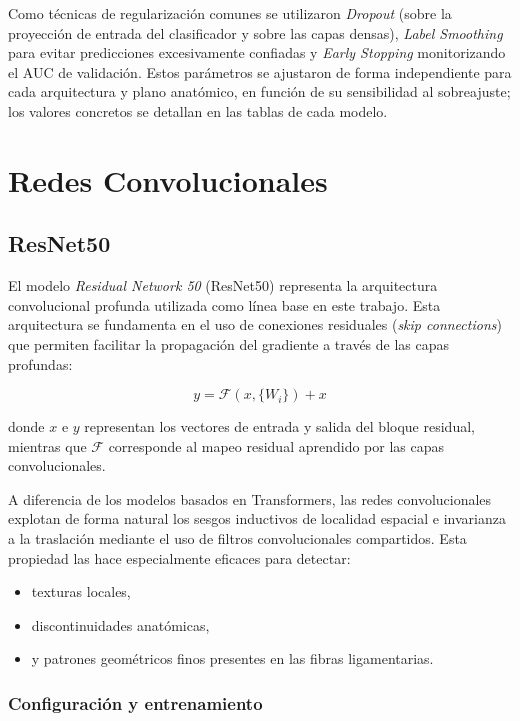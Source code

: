 Como técnicas de regularización comunes se utilizaron \textit{Dropout} (sobre la proyección de entrada del clasificador y sobre las capas densas), \textit{Label Smoothing} para evitar predicciones excesivamente confiadas y \textit{Early Stopping} monitorizando el AUC de validación. Estos parámetros se ajustaron de forma independiente para cada arquitectura y plano anatómico, en función de su sensibilidad al sobreajuste; los valores concretos se detallan en las tablas de cada modelo.

\section{Redes Convolucionales}
\label{sec:redes_convolucionales}

\subsection{ResNet50}
\label{subsec:cnn_resnet50}

El modelo \textit{Residual Network 50} (ResNet50) \cite{he2016deep} representa la arquitectura convolucional profunda utilizada como línea base en este trabajo. Esta arquitectura se fundamenta en el uso de conexiones residuales (\textit{skip connections}) que permiten facilitar la propagación del gradiente a través de las capas profundas:

\begin{equation}
y = \mathcal{F}(x, \{W_i\}) + x
\end{equation}

donde $x$ e $y$ representan los vectores de entrada y salida del bloque residual, mientras que $\mathcal{F}$ corresponde al mapeo residual aprendido por las capas convolucionales.

A diferencia de los modelos basados en Transformers, las redes convolucionales explotan de forma natural los sesgos inductivos de localidad espacial e invarianza a la traslación mediante el uso de filtros convolucionales compartidos. Esta propiedad las hace especialmente eficaces para detectar:
\begin{itemize}
    \item texturas locales,
    \item discontinuidades anatómicas,
    \item y patrones geométricos finos presentes en las fibras ligamentarias.
\end{itemize}

\subsubsection{Configuración y entrenamiento}

